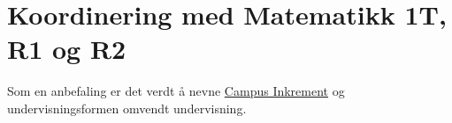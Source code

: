 \section{Koordinering med Matematikk 1T, R1 og R2} \label{Sec: KoordR1R2}

	Som en anbefaling er det verdt å nevne \href{https://campus.inkrement.no/Home/Catalog}{Campus Inkrement} og undervisningsformen omvendt undervisning.
